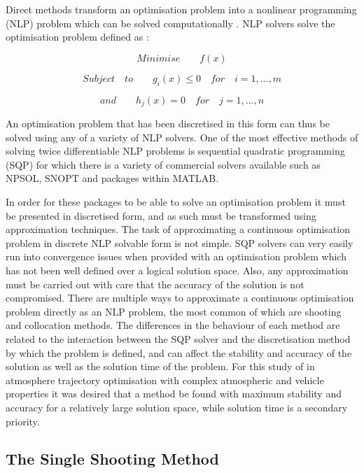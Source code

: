 Direct methods transform an optimisation problem into a nonlinear programming (NLP) problem which can be solved computationally \cite{Stryk1992}. NLP solvers solve the optimisation problem defined as \cite{Bazaraa2013}:

\begin{equation}
Minimise \qquad f(x)
\end{equation}

\begin{equation}
Subject \quad to \qquad g_i(x)\leq0 \quad for \quad i=1,...,m
\end{equation}

\begin{equation}
and \qquad h_j(x) = 0 \quad for \quad j=1,...,n
\end{equation}

An optimisation problem that has been discretised in this form can thus be solved using any of a variety of NLP solvers. One of the most effective methods of solving twice differentiable NLP problems is sequential quadratic programming (SQP) \cite{Boggs2000} for which there is a variety of commercial solvers available such as NPSOL, SNOPT and packages within MATLAB. 

In order for these packages to be able to solve an optimisation problem it must be presented in discretised form, and as such must be transformed using approximation techniques. The task of approximating a continuous optimisation problem in discrete NLP solvable form is not simple. SQP solvers can very easily run into convergence issues when provided with an optimisation problem which has not been well defined over a logical solution space. Also, any approximation must be carried out with care that the accuracy of the solution is not compromised. There are multiple ways to approximate a continuous optimisation problem directly as an NLP problem, the most common of which are shooting and collocation methods. The differences in the behaviour of each method are related to the interaction between the SQP solver and the discretisation method by which the problem is defined, and can affect the stability and accuracy of the solution as well as the solution time of the problem. For this study of in atmosphere trajectory optimisation with complex atmospheric and vehicle properties it was desired that a method be found with maximum stability and accuracy for a relatively large solution space, while solution time is a secondary priority.

\subsection{The Single Shooting Method}


